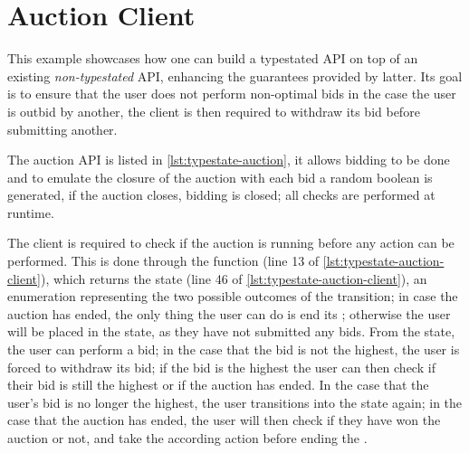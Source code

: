 \section{Auction Client}\label{sec:case-study:auction}

This example showcases how one can build a typestated API on top of an existing \emph{non-typestated} API,
enhancing the guarantees provided by latter.
Its goal is to ensure that the user does not perform non-optimal bids 
in the case the user is outbid by another, the client is then required to withdraw its bid before submitting another.

The auction API is listed in \autoref{lst:typestate-auction},
it allows bidding to be done and to emulate the closure of the auction with each bid a random boolean is generated,
if the auction closes, bidding is closed; all checks are performed at runtime.

The client is required to check if the auction is running before any action can be performed.
This is done through the  function (line 13 of \autoref{lst:typestate-auction-client}),
which returns the  state (line 46 of \autoref{lst:typestate-auction-client}),
an enumeration representing the two possible outcomes of the transition;
in case the auction has ended, the only thing the user can do is end its ;
otherwise the user will be placed in the  state, as they have not submitted any bids.
From the  state, the user can perform a bid;
in the case that the bid is not the highest, the user is forced to withdraw its bid;
if the bid is the highest the user can then check if their bid is still the highest or if the auction has ended.
In the case that the user's bid is no longer the highest, the user transitions into the  state again;
in the case that the auction has ended, the user will then check if they have won the auction or not,
and take the according action before ending the .


